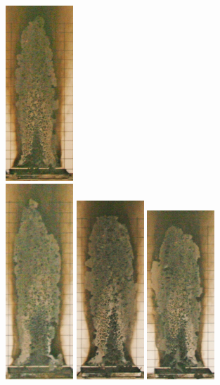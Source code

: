 \documentclass[twoside]{uocthesis}
\begin{document}
{\begin{figure}[p]
	\includegraphics[width=1.0in]{../Figures/GBGAS_29_IMG_6250} \\

	\includegraphics[width=1.0in]{../Figures/GBGAS_30_IMG_6269}
	\includegraphics[width=1.0in]{../Figures/GBGAS_31_IMG_6288}
	\includegraphics[width=1.0in]{../Figures/GBGAS_32_IMG_6307}

\end{figure}}
\end{document}
